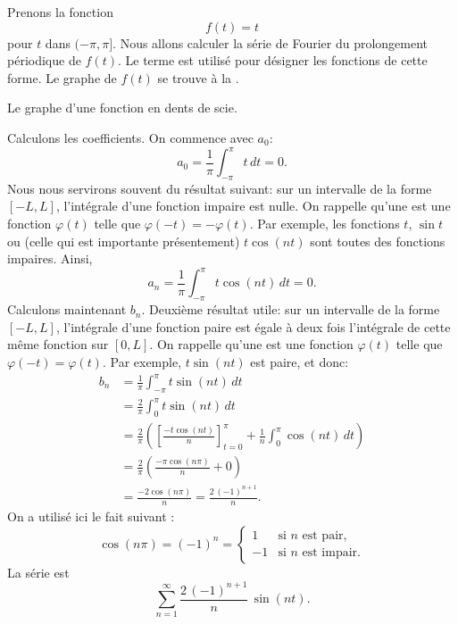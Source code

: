 \begin{example}
Prenons la fonction
\begin{equation*}
f(t) = t
\end{equation*}
pour $t$ dans $(-\pi,\pi]$. Nous allons calculer la série de Fourier du prolongement périodique de $f(t)$.  Le terme \emph{} est utilisé pour désigner les fonctions de cette forme.  Le graphe de $f(t)$ se trouve à la .

\begin{myfig}
\capstart
{}
\caption{Le graphe d'une fonction en dents de scie.\label{ts:sawtoothfig}}
\end{myfig}
Calculons les coefficients. On commence avec  $a_0$: 
\begin{equation*}
a_0 = \frac{1}{\pi} \int_{-\pi}^\pi t \,dt = 0 .
\end{equation*}
Nous nous servirons souvent du résultat suivant: sur un intervalle de la forme $[-L,L]$,  l'intégrale d'une fonction impaire est nulle. On rappelle qu'une 
\emph{} est une fonction 
 $\varphi(t)$ telle que $\varphi(-t) = -\varphi(t)$.  Par exemple, les fonctions $t$, $\sin t$ ou (celle qui est importante présentement)
$t \cos (nt)$ sont toutes des fonctions impaires.  Ainsi,
\begin{equation*}
a_n = \frac{1}{\pi} \int_{-\pi}^\pi t \cos (nt) \,dt = 0 .
\end{equation*}
Calculons maintenant $b_n$.  Deuxième résultat utile: sur un intervalle de la forme $[-L,L]$, l'intégrale d'une fonction paire est égale à deux fois l'intégrale de cette même fonction sur $[0,L]$. On rappelle qu'une  \emph{}
est une fonction $\varphi(t)$ telle que  $\varphi(-t) = \varphi(t)$.  Par exemple,
$t \sin (nt)$ est paire, et donc: 
\begin{equation*}
\begin{split}
b_n & = \frac{1}{\pi} \int_{-\pi}^\pi t \sin (nt) \,dt \\
& = \frac{2}{\pi} \int_{0}^\pi t \sin (nt) \,dt \\
& = \frac{2}{\pi} \left(
\left[ \frac{-t \cos (nt)}{n} \right]_{t=0}^{\pi}
+
\frac{1}{n}
\int_{0}^\pi \cos (nt) \,dt
\right)
\\
& = \frac{2}{\pi} \left(
\frac{-\pi \cos (n\pi)}{n}
+
0
\right) \\
& =  \frac{-2 \cos (n\pi)}{n}
=  \frac{2 \,{(-1)}^{n+1}}{n} .
\end{split}
\end{equation*}
On a utilisé ici le fait suivant :  
\begin{equation*}
\cos (n\pi) = {(-1)}^n =
\begin{cases}
1 & \text{si } n \text{ est pair} , \\
-1 & \text{si } n \text{ est impair} .
\end{cases}
\end{equation*}
La série est
\begin{equation*}
\sum_{n=1}^\infty
\frac{2 \,{(-1)}^{n+1}}{n} \,
\sin (n t) .
\end{equation*}


\end{example}
